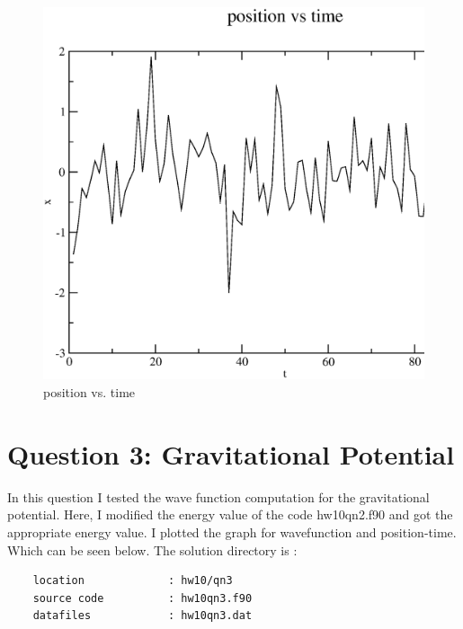 \documentclass[11pt,a4paper,english]{article}
\begin{document}
		   
	\begin{figure}[h!]
	\centering
	\includegraphics [scale=0.6]{figures/hw10qn2b.eps}
	\caption{position vs. time }
	\end{figure}
	\clearpage
    
\section{Question 3: Gravitational Potential }
    In this question I tested the wave function computation for the gravitational potential.
    Here, I modified the energy value of the code hw10qn2.f90 and got the appropriate energy value.
    I plotted the graph for wavefunction and position-time. Which can be seen below. 
    		The solution directory is :\\
	\begin{verbatim}
	location             : hw10/qn3
	source code          : hw10qn3.f90
	datafiles            : hw10qn3.dat
	\end{verbatim}
	
\end{document}
